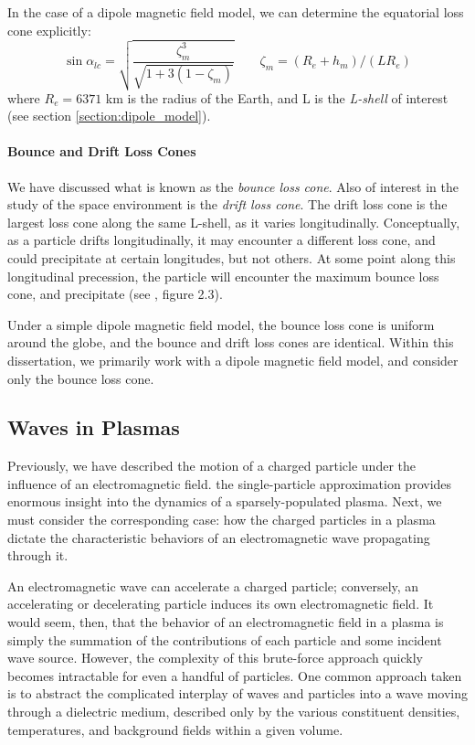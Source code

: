 In the case of a dipole magnetic field model, we can determine the equatorial loss cone explicitly:
\begin{equation}
\sin \alpha_{lc} = \sqrt{\frac{\zeta_m^3}{\sqrt{1 + 3 (1 - \zeta_m)}}} \qquad \zeta_m = (R_e + h_m) / (L R_e)
\end{equation}
where $R_e = 6371$ km is the radius of the Earth, and L is the \emph{L-shell} of interest (see section \ref{section:dipole_model}).



\paragraph{Bounce and Drift Loss Cones}
We have discussed what is known as the \emph{bounce loss cone}. Also of interest in the study of the space environment is the \emph{drift loss cone}. The drift loss cone is the largest loss cone along the same L-shell, as it varies longitudinally. Conceptually, as a particle drifts longitudinally, it may encounter a different loss cone, and could precipitate at certain longitudes, but not others. At some point along this longitudinal precession, the particle will encounter the maximum bounce loss cone, and precipitate (see \cite{Cotts2011}, figure 2.3). 

Under a simple dipole magnetic field model, the bounce loss cone is uniform around the globe, and the bounce and drift loss cones are identical. Within this dissertation, we primarily work with a dipole magnetic field model, and consider only the bounce loss cone.

\subsection{Waves in Plasmas}
\label{section:waves_in_plasmas}
Previously, we have described the motion of a charged particle under the influence of an electromagnetic field. the single-particle approximation provides enormous insight into the dynamics of a sparsely-populated plasma. Next, we must consider the corresponding case: how the charged particles in a plasma dictate the characteristic behaviors of an electromagnetic wave propagating through it.

An electromagnetic wave can accelerate a charged particle; conversely, an accelerating or decelerating particle induces its own electromagnetic field. It would seem, then, that the behavior of an electromagnetic field in a plasma is simply the summation of the contributions of each particle and some incident wave source. However, the complexity of this brute-force approach quickly becomes intractable for even a handful of particles. One common approach taken is to abstract the complicated interplay of waves and particles into a wave moving through a dielectric medium, described only by the various constituent densities, temperatures, and background fields within a given volume. 

